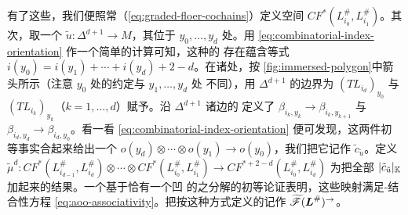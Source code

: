有了这些，我们便照常（\eqref{eq:graded-floer-cochains}）定义\trMorphism{}空间%
$CF^*(L_{i_0}^{\#},L_{i_1}^{\#})$。其次，取一个\trImmersion\trPolygon{}
$\tilde{u}\colon\Delta^{d+1}\to M$，其\trCornerPoint{}位于 $y_0,\ldots,y_d$ 处。用%
\eqref{eq:combinatorial-index-orientation} 作一个简单的计算可知，这种\trPolygon{}的%
存在蕴含等式 $i(y_0)=i(y_1)+\cdots+i(y_d)+2-d$。在诸\trCornerPoint{}处，按%
\cref{fig:immersed-polygon}中箭头所示（注意 $y_0$ 处的约定与 $y_1,\ldots,y_d$ 处%
不同），用 $\Delta^{d+1}$ 的边界\trOrientation{}为 $(TL_{i_d})_{y_0}$ 与%
$(TL_{i_k})_{y_k}$（$k=1,\ldots,d$）赋予\trOrientation。沿 $\Delta^{d+1}$ 诸边的%
\trParallelTransport{}定义了\trIsomorphism{} $\beta_{i_k,y_k}\to\beta_{i_k,y_{k+1}}$%
与 $\beta_{i_d,y_d}\to\beta_{i_d,y_0}$。看一看 \eqref{eq:combinatorial-index-orientation}%
便可发现，这两件初等事实合起来给出一个\trIsomorphism{} $o(y_d)\otimes\cdots\otimes%
o(y_1)\to o(y_0)$，我们把它记作 $\tilde{c}_{\tilde{u}}$。定义
$\tilde{\mu}^d\colon CF^*(L_{i_{d-1}}^{\#},L_{i_d}^{\#})\otimes\cdots\otimes%
CF^*(L_{i_0}^{\#},L_{i_1}^{\#})\to CF^{*+2-d}(L_{i_0}^{\#},L_{i_d}^{\#})$ 为把全部%
\trNormalization{} $|\tilde{c}_{\tilde{u}}|_{\mathbb{K}}$ 加起来的结果。一个基于恰有一个凹%
\trCornerPoint{}的\trPolygon{}之分解的初等论证表明，这些映射满足\trAinfty-结合性方程%
\eqref{eq:aoo-associativity}。把按这种方式定义的\trDirected{}\trACategory{}记作%
$\widetilde{\mathscr{F}}(\boldsymbol{L}^{\#})^{\to}$。
